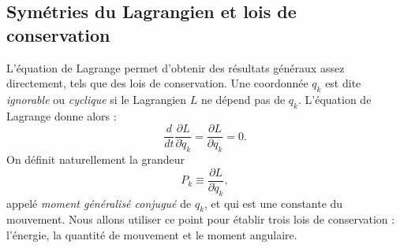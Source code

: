 \subsection{Symétries du Lagrangien et lois de conservation}
\label{sec:symlagrange}
L'équation de Lagrange permet d'obtenir des résultats généraux assez directement, tels que des lois de conservation. Une coordonnée $q_k$ est dite \textit{ignorable} ou \textit{cyclique} si le Lagrangien $L$ ne dépend pas de $q_k$. L'équation de Lagrange donne alors :
\begin{equation}
\frac{d}{dt}\frac{\partial L}{\partial \dot{q}_k} = \frac{\partial L}{\partial q_k} = 0.
\end{equation}
On définit naturellement la grandeur 
\begin{equation}
P_k\equiv\frac{\partial L}{\partial \dot{q}_k},
\end{equation}
appelé \textit{moment généralisé conjugué} de $q_k$, et qui est une constante du mouvement. Nous allons utiliser ce point pour établir trois lois de conservation : l'énergie, la quantité de mouvement et le moment angulaire.

